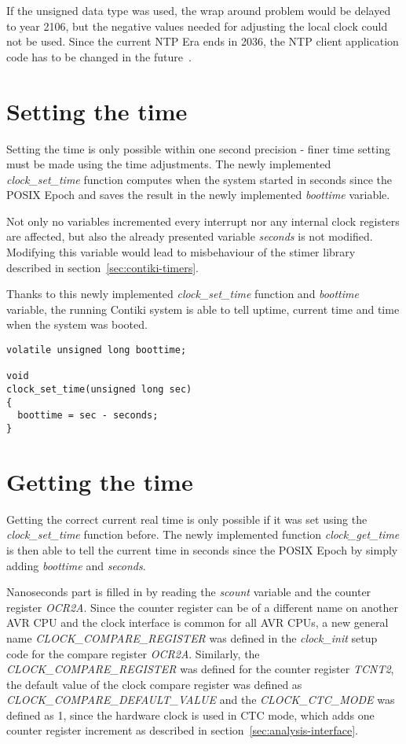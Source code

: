 If the unsigned data type was used, the wrap around problem would be delayed to year 2106,
but the negative values needed for adjusting the local clock could not be used.
Since the current NTP Era ends in 2036,
the NTP client application code has to be changed in the future~\cite{ntp-y2k}.

\section{Setting the time}
Setting the time is only possible within one second precision -
finer time setting must be made using the time adjustments.
The newly implemented {\it{clock\_set\_time}} function computes when the system started
in seconds since the POSIX Epoch and saves the result in the newly implemented {\it{boottime}} variable.

Not only no variables incremented every interrupt nor any internal clock registers
are affected, but also the already presented variable {\it{seconds}} is not modified.
Modifying this variable would lead to misbehaviour of the stimer library
described in section~\ref{sec:contiki-timers}.

Thanks to this newly implemented {\it{clock\_set\_time}} function and {\it{boottime}} variable,
the running Contiki system is able to tell uptime, current time and time when the system was booted.
\begin{lstlisting}
volatile unsigned long boottime;

void
clock_set_time(unsigned long sec)
{
  boottime = sec - seconds;
}
\end{lstlisting}


\section{Getting the time}
Getting the correct current real time is only possible if it was set using
the {\it{clock\_set\_time}} function before.
The newly implemented function {\it{clock\_get\_time}} is then able to tell the
current time in seconds since the POSIX Epoch by simply adding {\it{boottime}}
and {\it{seconds}}.

Nanoseconds part is filled in by reading the {\it{scount}} variable and the counter register {\it{OCR2A}}.
Since the counter register can be of a different name on another AVR CPU
and the clock interface is common for all AVR CPUs,
a new general name {\it{CLOCK\_COMPARE\_REGISTER}} was defined in the {\it{clock\_init}} setup code
for the compare register {\it{OCR2A}}.
Similarly, the {\it{CLOCK\_COMPARE\_REGISTER}} was defined for the counter register {\it{TCNT2}},
the default value of the clock compare register was defined as {\it{CLOCK\_COMPARE\_DEFAULT\_VALUE}}
and the {\it{CLOCK\_CTC\_MODE}} was defined as 1, since the hardware clock is used in CTC mode,
which adds one counter register increment as described in section~\ref{sec:analysis-interface}.


